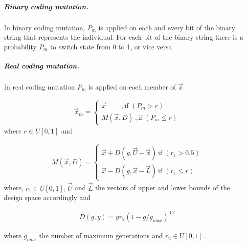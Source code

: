 \subparagraph{Binary coding mutation.} In binary coding mutation, $P_m$ is applied on each and every bit of the binary string that represents the individual. For each bit of the binary string there is a probability $P_m$ to switch state from 0 to 1, or vice versa.      

\begin{figure}[h!]
\begin{minipage}[b]{1\linewidth}
 \centering
\end{minipage}
\label{binarymut}
\end{figure}

\subparagraph{Real coding mutation.} In real coding mutation $P_m$ is applied on each member of $\vec{x}$. 

\begin{eqnarray}
	\vec{x}_m={\left\{ 
	\begin{array}{ll}
    \vec{x}~~~~~~~~~~,\mbox{if $(P_m > r)$}\\
	M(\vec{x},D)~,\mbox{if $(P_m \leq r)$}
    \end{array} \right. }
    \label{}
\end{eqnarray}
where $r\in U[0,1]$ and

\begin{eqnarray}
	M(\vec{x},D)={\left\{ 
	\begin{array}{ll}
    \vec{x}+D(g,\vec{U}-\vec{x})~\mbox{if $(r_1 > 0.5)$}\\
	\vec{x}-D(g,\vec{x}-\vec{L})~\mbox{if $(r_1 \leq r)$}
    \end{array} \right. }
    \label{}
\end{eqnarray}
where, $r_1\in U[0,1]$, $\vec{U}$ and $\vec{L}$ the vectors of upper and lower bounds of the design space accordingly and  

\begin{eqnarray}
   D(g,y) = y r_2 (1-g/g_{max})^{0.2}
\end{eqnarray}

where $g_{max}$ the number of maximum generations and $r_2\in U[0,1]$.


